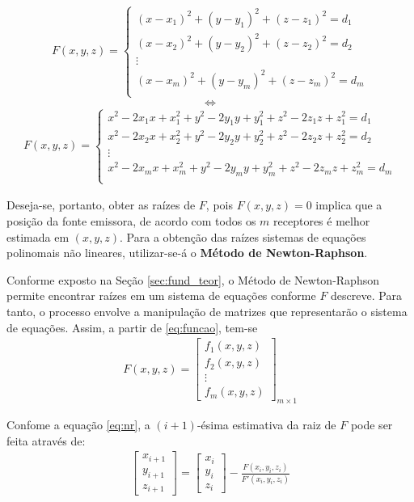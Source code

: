 	\begin{align*}
		F(x,y,z) =
		\left \{
		\begin{array}{cl}
			(x - x_1)^2 + (y - y_1)^2 + (z - z_1)^2 = d_1\\
			(x - x_2)^2 + (y - y_2)^2 + (z - z_2)^2 = d_2\\
			\vdots \\
			(x - x_m)^2 + (y - y_m)^2 + (z - z_m)^2 = d_m\\
		\end{array}
		\right.
	\end{align*}
	$$\iff$$
	\begin{align*}
		F(x,y,z) =
		\left \{
		\begin{array}{cl}
			x^2 - 2x_1x + x_1^2 + y^2 - 2y_1y + y_1^2 + z^2 - 2z_1z + z_1^2 = d_1\\
			x^2 - 2x_2x + x_2^2 + y^2 - 2y_2y + y_2^2 + z^2 - 2z_2z + z_2^2 = d_2\\
			\vdots \\
			x^2 - 2x_mx + x_m^2 + y^2 - 2y_my + y_m^2 + z^2 - 2z_mz + z_m^2 = d_m\\
		\end{array}
		\right.
	\end{align*}

	Deseja-se, portanto, obter as raízes de $F$, pois $F(x,y,z) = 0$ implica que a posição
	da fonte emissora, de acordo com todos os $m$ receptores é melhor estimada em $(x,y,z)$.
	Para a obtenção das raízes sistemas de equações polinomais não lineares, utilizar-se-á o
	\textbf{Método de Newton-Raphson}.

	Conforme exposto na Seção \ref{sec:fund_teor}, o Método de Newton-Raphson permite encontrar
	raízes em um sistema de equações conforme $F$ descreve. Para tanto, o processo envolve a manipulação
	de matrizes que representarão o sistema de equações. Assim, a partir de \ref{eq:funcao}, tem-se
	\begin{align*}
		F(x,y,z) =
		\begin{bmatrix}
			f_1(x,y,z) \\
			f_2(x,y,z) \\
			\vdots \\
			f_m(x,y,z)
		\end{bmatrix}_{m\times1}
	\end{align*}

	Confome a equação \ref{eq:nr}, a $(i+1)$-ésima estimativa da raiz de $F$ pode ser feita através de:
	\begin{align}
		\begin{bmatrix}
	    x_{i+1}\\
			y_{i+1}\\
			z_{i+1}
		\end{bmatrix}
		=
		\begin{bmatrix}
	    x_i\\
			y_i\\
			z_i
		\end{bmatrix}
		-
		\frac{F(x_i,y_i,z_i)}{F'(x_i, y_i, z_i)}
		\label{eq:part_nr}
	\end{align}

